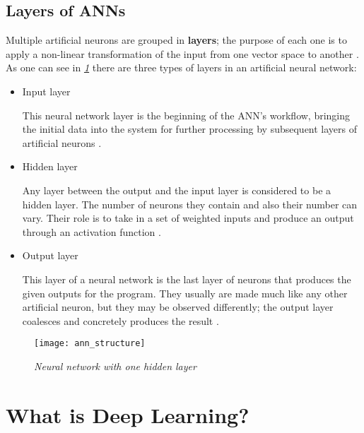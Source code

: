 \subsection{Layers of ANNs}
Multiple artificial neurons are grouped in \textbf{layers};
the purpose of each one is to apply a non-linear
transformation of the input from one vector space to another \cite{appliedDeepLearning}.
As one can see in \emph{\ref{fig:ann_structure}} there are three types of layers in an artificial neural network:
\begin{itemize}[]
  \item{ Input layer
        \begin{adjustwidth}{1cm}{}
          This neural network layer is the beginning of the ANN’s workflow, bringing the initial data into the system for
          further processing by subsequent layers of artificial neurons \cite{inputLayer}.
        \end{adjustwidth}
        }
  \item{ Hidden layer
        \begin{adjustwidth}{1cm}{}
          Any layer between the output and the input layer is considered to be a hidden layer.
          The number of neurons they contain and also their number can vary.
          Their role is to take in a set of weighted inputs and produce an output through an activation function \cite{hiddenlayer}.
        \end{adjustwidth}
        }
  \item{ Output layer
        \begin{adjustwidth}{1cm}{}
          This layer of a neural network is the last layer of neurons that produces the given outputs for the program.
          They usually are made much like any other artificial neuron, but they may be observed differently;
          the output layer coalesces and concretely produces the result \cite{outputLayer}.
        \end{adjustwidth}
        }
\end{itemize}
\begin{figure}[h]
  \centering
  \texttt{[image: ann\_structure]}
  \caption{\emph{Neural network with one hidden layer \cite{understandingANN}}}
  \label{fig:ann_structure}
\end{figure}


\section{What is Deep Learning?}

